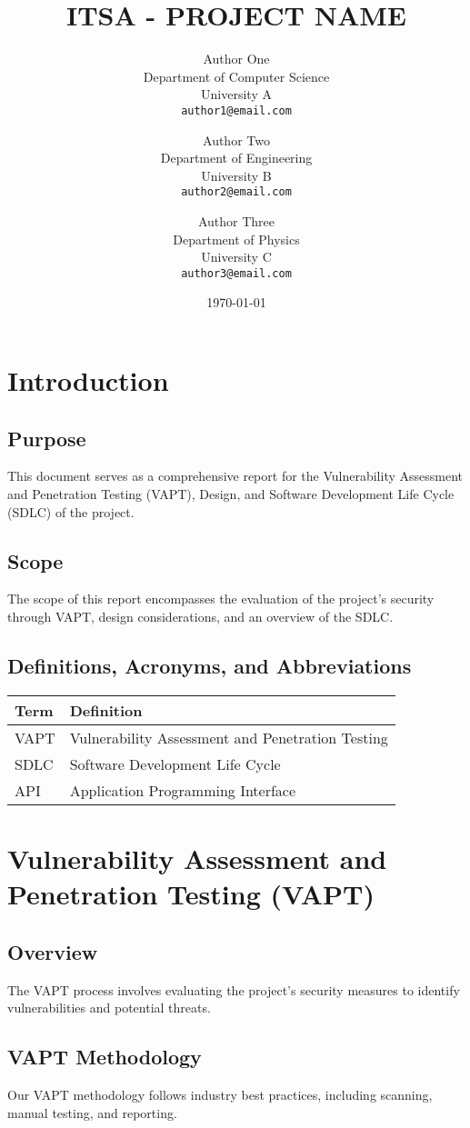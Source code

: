 \documentclass[11pt]{article}
\title{ITSA - PROJECT NAME}
\author{
  Author One \\
  Department of Computer Science \\
  University A \\
  \texttt{author1@email.com}
  \and
  Author Two \\
  Department of Engineering \\
  University B \\
  \texttt{author2@email.com}
  \and
  Author Three \\
  Department of Physics \\
  University C \\
  \texttt{author3@email.com}
}
\date{\today}
\begin{document}
\maketitle
\newpage
\tableofcontents
\newpage

\section{Introduction}
\subsection{Purpose}
This document serves as a comprehensive report for the Vulnerability Assessment and Penetration Testing (VAPT), Design, and Software Development Life Cycle (SDLC) of the project.

\subsection{Scope}
The scope of this report encompasses the evaluation of the project's security through VAPT, design considerations, and an overview of the SDLC.

\subsection{Definitions, Acronyms, and Abbreviations}
\begin{tabularx}{\textwidth}{|l|X|}
    \hline
    \textbf{Term} & \textbf{Definition} \\
    \hline
    VAPT & Vulnerability Assessment and Penetration Testing \\
    \hline
    SDLC & Software Development Life Cycle \\
    \hline
    API & Application Programming Interface \\
    \hline
\end{tabularx}

\section{Vulnerability Assessment and Penetration Testing (VAPT)}
\subsection{Overview}
The VAPT process involves evaluating the project's security measures to identify vulnerabilities and potential threats.

\subsection{VAPT Methodology}
Our VAPT methodology follows industry best practices, including scanning, manual testing, and reporting.
\end{document}
